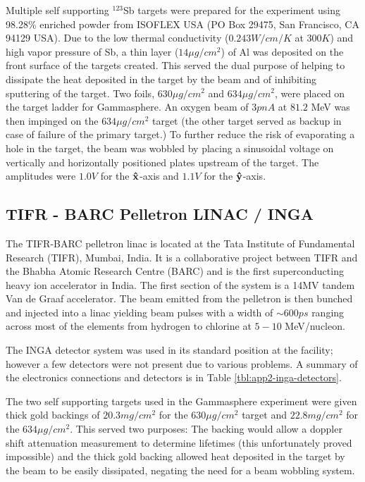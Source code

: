 Multiple self supporting $^{123}$Sb targets were prepared for the experiment using 98.28\% enriched powder from ISOFLEX USA (PO Box 29475, San Francisco, CA 94129 USA)\cite{sbTargets}. Due to the low thermal conductivity ($0.243W/cm/K$ at $300K$\cite{thermalCond}) and high vapor pressure\cite{sbPartialP,sbTargets} of Sb, a thin layer ($14\mu{}g/cm^2$) of Al was deposited on the front surface of the targets created. This served the dual purpose of helping to dissipate the heat deposited in the target by the beam and of inhibiting sputtering of the target. Two foils, $630\mu{}g/cm^2$ and $634\mu{}g/cm^2$, were placed on the target ladder for Gammasphere. An oxygen beam of $3pnA$ at $81.2$ MeV was then impinged on the $634\mu{}g/cm^2$ target (the other target served as backup in case of failure of the primary target.) To further reduce the risk of evaporating a hole in the target, the beam was wobbled by placing a sinusoidal voltage on vertically and horizontally positioned plates upstream of the target. The amplitudes were $1.0V$ for the $\boldsymbol{\hat{\textbf{x}}}$-axis and $1.1V$ for the $\boldsymbol{\hat{\textbf{y}}}$-axis.

\subsection{TIFR - BARC Pelletron LINAC / INGA}
\label{ssec:exp-pr-details-inga}
The TIFR-BARC pelletron linac is located at the Tata Institute of Fundamental Research (TIFR), Mumbai, India. It is a collaborative project between TIFR and the Bhabha Atomic Research Centre (BARC) and is the first superconducting heavy ion accelerator in India. The first section of the system is a 14MV tandem Van de Graaf accelerator. The beam emitted from the pelletron is then bunched and injected into a linac yielding beam pulses with a width of $\sim{}600ps$ ranging across most of the elements from hydrogen to chlorine at $5-10$ MeV/nucleon.

The INGA detector system was used in its standard position at the facility; however a few detectors were not present due to various problems. A summary of the electronics connections and detectors is in Table \ref{tbl:app2-inga-detectors}.

The two self supporting targets used in the Gammasphere experiment were given thick gold backings of $20.3mg/cm^2$ for the $630\mu{}g/cm^2$ target and $22.8mg/cm^2$ for the $634\mu{}g/cm^2$\cite{sbTargets}. This served two purposes: The backing would allow a doppler shift attenuation measurement to determine lifetimes (this unfortunately proved impossible) and the thick gold backing allowed heat deposited in the target by the beam to be easily dissipated, negating the need for a beam wobbling system.

